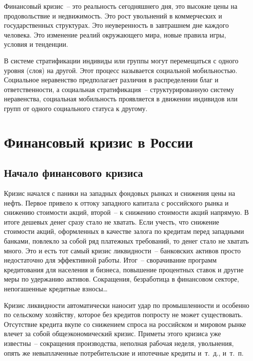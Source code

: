   Финансовый кризис~-- это реальность сегодняшнего дня, это высокие цены на
  продовольствие и недвижимость. Это рост увольнений в коммерческих и
  государственных структурах. Это неуверенность в завтрашнем дне каждого
  человека. Это изменение реалий окружающего мира, новые правила игры, условия
  и тенденции.
  
  В системе стратификации индивиды или группы могут перемещаться с одного
  уровня (слоя) на другой. Этот процесс называется социальной мобильностью.
  Социальное неравенство предполагает различия в распределении благ и
  ответственности, а социальная стратификация~-- структурированную систему
  неравенства, социальная мобильность проявляется в движении индивидов или
  групп от одного социального статуса к другому. 

  \section{Финансовый кризис в России}
  
  \subsection{Начало финансового кризиса}
  
  Кризис начался с паники на западных фондовых рынках и снижения цены на нефть.
  Первое привело к оттоку западного капитала с российского рынка и снижению
  стоимости акций, второй~-- к снижению стоимости акций напрямую. В итоге
  дешевых денег сразу стало не хватать. Если учесть, что снижение стоимости
  акций, оформленных в качестве залога по кредитам перед западными банками,
  повлекло за собой ряд платежных требований, то денег стало не хватать много.
  Это и есть тот самый кризис ликвидности~-- банковских активов просто
  недостаточно для эффективной работы. Итог~-- сворачивание программ
  кредитования для населения и бизнеса, повышение процентных ставок и другие
  меры по удержанию активов. Сокращения, безработица в финансовом секторе,
  непогашенные кредитные взносы\ldots
    
  Кризис ликвидности автоматически наносит удар по промышленности и особенно по
  сельскому хозяйству, которое без кредитов попросту не может существовать.
  Отсутствие кредита вкупе со снижением спроса на российском и мировом рынке
  влечет за собой общеэкономический кризис. Приметы этого кризиса уже
  известны~-- сокращения производства, неполная рабочая неделя, увольнения,
  опять же невыплаченные потребительские и ипотечные кредиты и~т.~д., и~т.~п.
  
